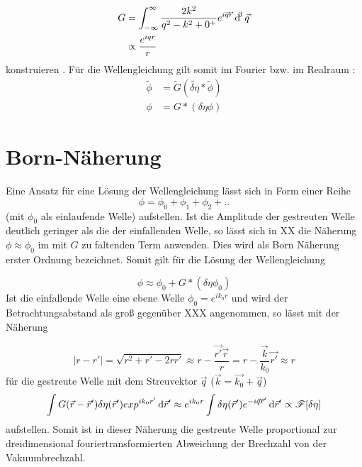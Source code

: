 \begin{align}
G&=\int_{-\infty}^{\infty} \frac{2k^2}{q^2-k^2+0^+} e^{i\vec{q}\vec{r}}\dif^3 \vec{q}\nonumber\\
&\propto\frac{e^{iqr}}{r}
\end{align}
konstruieren \cite{trigg2006}. Für die Wellengleichung gilt somit im Fourier bzw. im Realraum \cite{cowley1995,thibault2007}:
\begin{align}
\tilde{\phi}&=\tilde{G}(\tilde{\delta \eta} \ast \tilde{\phi})\\
\phi&={G}\ast({\delta \eta}  {\phi})
\end{align}

\section{Born-Näherung}
Eine Ansatz für  eine Lösung der Wellengleichung lässt sich in Form einer Reihe
\begin{equation}
\phi=\phi_0+\phi_1+\phi_2+..
\end{equation}
(mit $\phi_0$ als einlaufende Welle) aufstellen. Ist die Amplitude der gestreuten Welle deutlich geringer als die der einfallenden Welle, so lässt sich in XX die Näherung $\phi\approx\phi_0$ im mit $G$ zu faltenden Term anwenden. Dies wird als Born Näherung erster Ordnung bezeichnet. Somit gilt für die Lösung der Wellengleichung

\begin{equation}
\phi\approx\phi_0+G\ast({\delta \eta} \phi_0)
\end{equation}
Ist die einfallende Welle eine ebene Welle $\phi_0=e^{ik_0r}$ und wird der Betrachtungsabstand als groß gegenüber XXX angenommen, so lässt mit der Näherung

\begin{equation}
|r-r'|=\sqrt{r^2+r'-2rr'}\approx r-\frac{\vec{r'}\vec{r}}{r}=r-\frac{\vec{k}}{k_0}\vec{r'}\approx r
\end{equation}
für die gestreute Welle mit dem Streuvektor $\vec{q}$ ($\vec{k}=\vec{k_0}+\vec{q}$)
\begin{equation}
\int G(\vec{r}-\vec{r}')\delta\eta(\vec{r}') exp^{ik_0r'}  \dif \vec{r}'\approx e^{ik_0r}\int \delta\eta(\vec{r}')e^{-i\vec{q}\vec{r}'}\dif \vec{r}'\propto \mathscr{F}[\delta\eta]
\end{equation}
aufstellen. Somit ist in dieser Näherung die gestreute Welle proportional zur dreidimensional fouriertransformierten Abweichung der Brechzahl von der Vakuumbrechzahl.




